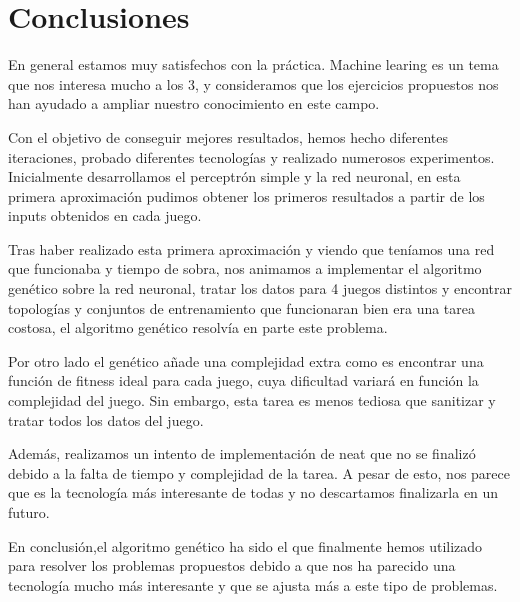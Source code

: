 \section{Conclusiones}
En general estamos muy satisfechos con la práctica. Machine learing es un tema que nos interesa mucho a los 3, y consideramos que los ejercicios propuestos nos han ayudado a ampliar nuestro conocimiento en este campo.

Con el objetivo de conseguir mejores resultados, hemos hecho diferentes iteraciones, probado diferentes tecnologías y realizado numerosos experimentos. Inicialmente desarrollamos el perceptrón simple y la red neuronal, en esta primera aproximación pudimos obtener los primeros resultados a partir de los inputs obtenidos en cada juego. 

Tras haber realizado esta primera aproximación y viendo que teníamos una red que funcionaba y tiempo de sobra, nos animamos a implementar el algoritmo genético sobre la red neuronal, tratar los datos para 4 juegos distintos y encontrar topologías y conjuntos de entrenamiento que funcionaran bien era una tarea costosa, el algoritmo genético resolvía en parte este problema.

Por otro lado el genético añade una complejidad extra como es encontrar una función de fitness ideal para cada juego, cuya dificultad variará en función la complejidad del juego. Sin embargo, esta tarea es menos tediosa que sanitizar y tratar todos los datos del juego.

Además, realizamos un intento de implementación de \ac{neat} que no se finalizó debido a la falta de tiempo y complejidad de la tarea. A pesar de esto, nos parece que es la tecnología más interesante de todas y no descartamos finalizarla en un futuro.

En conclusión,el algoritmo genético ha sido el que finalmente hemos utilizado para resolver los problemas propuestos debido a que nos ha parecido una tecnología mucho más interesante y que se ajusta más a este tipo de problemas.